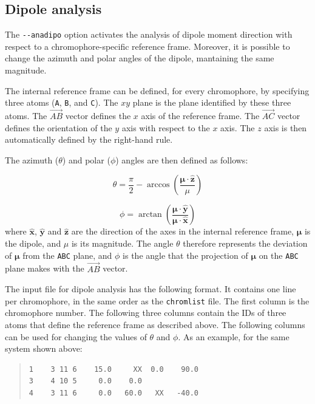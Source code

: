 \documentclass[a4paper,11pt]{article}
\newcommand{\bs}{\boldsymbol}
\begin{document}
\subsection{Dipole analysis}\label{sec:anadipo}

The \texttt{-{}-anadipo} option activates the analysis of dipole moment direction with respect to a chromophore-specific reference frame. Moreover, it is possible to change the azimuth and polar angles of the dipole, mantaining the same magnitude.

The internal reference frame can be defined, for every chromophore, by specifying three atoms (\texttt{A}, \texttt{B}, and \texttt{C}). The $xy$ plane is the plane identified by these three atoms. The $\vec{AB}$ vector defines the $x$ axis of the reference frame. The $\vec{AC}$ vector defines the orientation of the $y$ axis with respect to the $x$ axis. The $z$ axis is then automatically defined by the right-hand rule. 

The azimuth ($\theta$) and polar ($\phi$) angles are then defined as follows: 

\begin{equation}\label{eq:deftheta}
 \theta = \dfrac{\pi}{2} - \arccos\left(\dfrac{\bs{\mu}\cdot\hat{\mathbf{z}}}{\mu}\right)
\end{equation}

\begin{equation}\label{eq:defphi}
 \phi = \arctan\left(\dfrac{\bs{\mu}\cdot\hat{\mathbf{y}}}{\bs{\mu}\cdot\hat{\mathbf{x}}}\right)
\end{equation}
where $\hat{\mathbf{x}}$, $\hat{\mathbf{y}}$ and $\hat{\mathbf{z}}$ are the direction of the axes in the internal reference frame, $\bs{\mu}$ is the dipole, and $\mu$ is its magnitude. The angle $\theta$ therefore represents the deviation of $\bs{\mu}$ from the \texttt{ABC} plane, and $\phi$ is the angle that the projection of $\bs{\mu}$ on the \texttt{ABC} plane makes with the $\vec{AB}$ vector. 

The input file for dipole analysis has the following format. It contains one line per chromophore, in the same order as the \texttt{chromlist} file. The first column is the chromophore number. The following three columns contain the IDs of three atoms that define the reference frame as described above. The following columns can be used for changing the values of $\theta$ and $\phi$. As an example, for the same system shown above: 

\begin{framed}
\begin{quote}
\begin{verbatim}
1    3 11 6    15.0     XX  0.0    90.0
3    4 10 5     0.0    0.0 
4    3 11 6     0.0   60.0   XX   -40.0
\end{verbatim}
\end{quote}
\end{framed}
\end{document}
